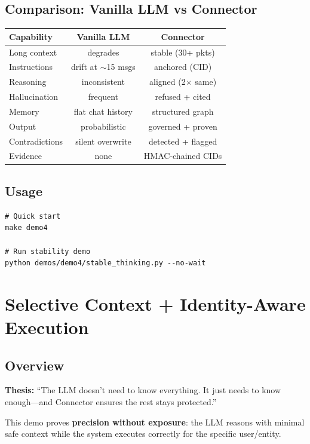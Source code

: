 \documentclass[11pt,a4paper]{article}
\begin{document}
\subsection{Comparison: Vanilla LLM vs Connector}

\begin{tabular}{lcc}
\toprule
\textbf{Capability} & \textbf{Vanilla LLM} & \textbf{Connector} \\
\midrule
Long context & degrades & stable (30+ pkts) \\
Instructions & drift at $\sim$15 msgs & anchored (CID) \\
Reasoning & inconsistent & aligned (2$\times$ same) \\
Hallucination & frequent & refused + cited \\
Memory & flat chat history & structured graph \\
Output & probabilistic & governed + proven \\
Contradictions & silent overwrite & detected + flagged \\
Evidence & none & HMAC-chained CIDs \\
\bottomrule
\end{tabular}

\subsection{Usage}

\begin{lstlisting}
# Quick start
make demo4

# Run stability demo
python demos/demo4/stable_thinking.py --no-wait
\end{lstlisting}

\newpage

\section{Selective Context + Identity-Aware Execution}

\subsection{Overview}
\textbf{Thesis:} ``The LLM doesn't need to know everything. It just needs to know enough---and Connector ensures the rest stays protected.''

This demo proves \textbf{precision without exposure}: the LLM reasons with minimal safe context while the system executes correctly for the specific user/entity.
\end{document}
